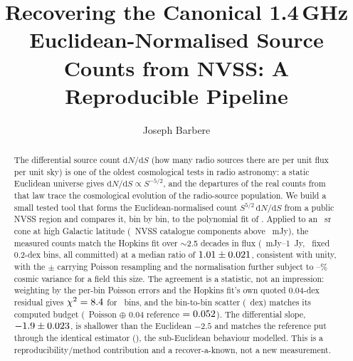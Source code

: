 \documentclass[twocolumn]{aastex631}
\begin{document}
\title{Recovering the Canonical 1.4\,GHz Euclidean-Normalised Source Counts from {NVSS}:
A Reproducible Pipeline}

\author[0009-0008-3289-4447]{Joseph Barbere}

\begin{abstract}
The differential source count $\mathrm{d}N/\mathrm{d}S$ (how many radio sources there are per unit
flux per unit sky) is one of the oldest cosmological tests in radio astronomy: a static Euclidean
universe gives $\mathrm{d}N/\mathrm{d}S\propto S^{-5/2}$, and the departures of the real counts from
that law trace the cosmological evolution of the radio-source population. We build a small tested tool
that forms the Euclidean-normalised count $S^{5/2}\,\mathrm{d}N/\mathrm{d}S$ from a public NVSS
\citep{condon1998} region and compares it, bin by bin, to the polynomial fit of
\citet{hopkins2003}. Applied to an \scArea~sr cone at high Galactic latitude (\scNsrc\ NVSS
catalogue components above \scSmin~mJy), the measured counts match the Hopkins fit over
$\sim$2.5 decades in flux (\scSmin~mJy--1~Jy, \scNbins\ fixed 0.2-dex bins, all committed) at a
median ratio of $1.01\pm0.021$, consistent with unity, with the $\pm$
carrying Poisson resampling and the normalisation further subject to
\scCvLo--\scCvHi\% cosmic variance for a field this size. The agreement is a statistic, not an
impression: weighting by the per-bin Poisson errors and the Hopkins fit's own quoted 0.04-dex
residual gives $\chi^2=8.4$ for \scNbins\ bins, and the bin-to-bin scatter
(\scScatter~dex) matches its computed budget (\scPoissonDex\ Poisson $\oplus$ 0.04 reference
$=0.052$). The differential slope, $-1.9\pm0.023$, is shallower than the
Euclidean $-2.5$ and matches the reference put through the identical estimator (\scSlopeRef),
the sub-Euclidean behaviour \citet{condon1984} modelled. This is a reproducibility/method
contribution and a recover-a-known, not a new measurement.
\end{abstract}

\end{document}
